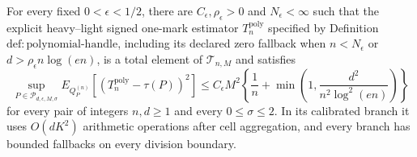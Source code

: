 For every fixed \(0<\epsilon<1/2\), there are \(C_{\epsilon},\rho_{\epsilon}>0\) and \(N_{\epsilon}<\infty\) such that the explicit heavy--light signed one-mark estimator \(T_n^{\mathrm{poly}}\) specified by Definition~\(\mathrm{def:polynomial\text{-}handle}\), including its declared zero fallback when \(n<N_{\epsilon}\) or \(d>\rho_{\epsilon}n\log(en)\), is a total element of \(\mathcal T_{n,M}\) and satisfies
\[
 \sup_{P\in\mathcal P_{d,\epsilon,M,\sigma}}
 E_{Q_P^{(n)}}[(T_n^{\mathrm{poly}}-\tau(P))^2]
 \le C_{\epsilon}M^2\left\{\frac1n+
 \min\left(1,\frac{d^2}{n^2\log^2(en)}\right)\right\}
\]
for every pair of integers \(n,d\ge1\) and every \(0\le\sigma\le2\).  In its calibrated branch it uses \(O(dK^2)\) arithmetic operations after cell aggregation, and every branch has bounded fallbacks on every division boundary.
